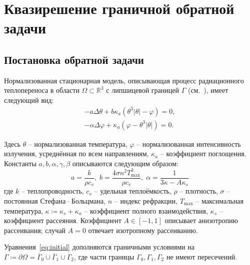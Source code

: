 \section{Квазирешение граничной обратной задачи}\label{sec:ch2/sec1}

\subsection{Постановка обратной задачи}\label{subsec:ch2/sec1/subsec1}

Нормализованная стационарная модель, описывающая процесс радиационного теплопереноса в
области $\Omega \subset \mathbb{R}^3$ с липшицевой границей $\Gamma$ (см.~\cite{OControl_1}), имеет следующий вид:
\begin{equation}
    \label{eq:initial}
    \begin{aligned}
        - a \Delta \theta + b \kappa_a(\theta ^ 3 | \theta | - \varphi) = 0,  \\
        - \alpha \Delta \varphi + \kappa_a (\varphi - \theta ^3 | \theta |) = 0.
    \end{aligned}
\end{equation}

Здесь $\theta$ -- нормализованная температура, $\varphi$ -- нормализованная интенсивность излучения,
усреднённая по всем направлениям, $\kappa_a$ -- коэффициент поглощения.
Константы $a, b, \alpha, \gamma, \beta$ описываются следующим образом:
\[
    a = \frac{k}{\rho c_v}, \; b = \frac{4 \sigma n^2 T^3_{\max}}{\rho c_v}, \;
    \alpha = \frac{1}{3\kappa -A \kappa_s}
\]
где $k$ -- теплопроводность, $c_v$ -- удельная теплоёмкость, $\rho$ -- плотность,
$\sigma$ -- постоянная Стефана\,--\,Больцмана, $n$ -- индекс рефракции,
$T_{\max}$ -- максимальная температура,
$\kappa \coloneqq \kappa_s + \kappa_a$ -- коэффициент полного взаимодействия,
$\kappa_s$ -- коэффициент рассеяния.
Коэффициент $A \in [-1,1]$ описывает анизотропию рассеивания;
случай $A=0$ отвечает изотропному рассеиванию.

Уравнения~\eqref{eq:initial} дополняются граничными условиями на
$\Gamma \coloneqq \partial \Omega =\overline{\Gamma}_0 \cup \overline{\Gamma}_1 \cup \overline{\Gamma}_2$,
где части границы $\Gamma_0, \Gamma_1, \Gamma_2$ не имеют пересечений.

